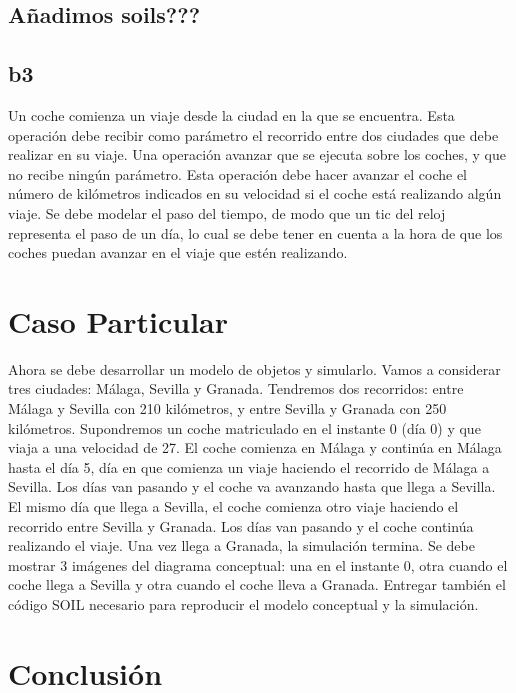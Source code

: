 \documentclass[12pt.a4paper]{article}
\begin{document}
\subsection{Añadimos soils???}
    
\subsection{b3}
Un coche comienza un viaje desde la ciudad en la que se encuentra. Esta operación debe recibir como parámetro el recorrido entre dos ciudades que debe realizar en su viaje.
Una operación avanzar que se ejecuta sobre los coches, y que no recibe ningún parámetro. Esta operación debe hacer avanzar el coche el número de kilómetros indicados en su velocidad si el coche está realizando algún viaje. Se debe modelar el paso del tiempo, de modo que un tic del reloj representa el paso de un día, lo cual se debe tener en cuenta a la hora de que los coches puedan avanzar en el viaje que estén realizando.

\newpage
\section{Caso Particular}
Ahora se debe desarrollar un modelo de objetos y simularlo. Vamos a considerar tres ciudades: Málaga, Sevilla y Granada. Tendremos dos recorridos: entre Málaga y Sevilla con 210 kilómetros, y entre Sevilla y Granada con 250 kilómetros. Supondremos un coche matriculado en el instante 0 (día 0) y que viaja a una velocidad de 27. El coche comienza en Málaga y continúa en Málaga hasta el día 5, día en que comienza un viaje haciendo el recorrido de Málaga a Sevilla. Los días van pasando y el coche va avanzando hasta que llega a Sevilla. El mismo día que llega a Sevilla, el coche comienza otro viaje haciendo el recorrido entre Sevilla y Granada. Los días van pasando y el coche continúa realizando el viaje. Una vez llega a Granada, la simulación termina.
Se debe mostrar 3 imágenes del diagrama conceptual: una en el instante 0, otra cuando el coche llega a Sevilla y otra cuando el coche lleva a Granada. Entregar también el código SOIL necesario para reproducir el modelo conceptual y la simulación.


\newpage
\section{Conclusión}
\lipsum[]
\end{document}
